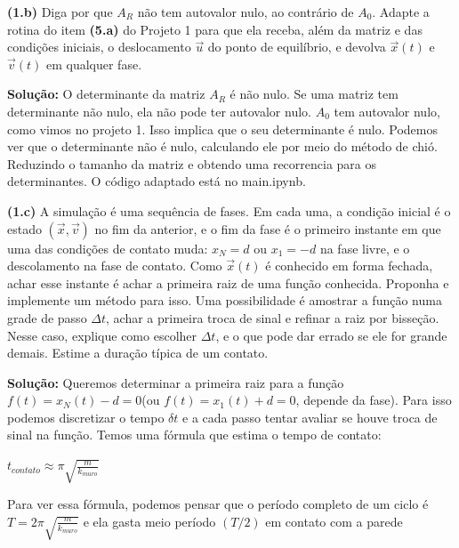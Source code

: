 \vspace{0.3cm}
\textbf{(1.b)} Diga por que $A_R$ não tem autovalor nulo, ao contrário de $A_0$. Adapte a rotina do item
\textbf{(5.a)} do Projeto 1 para que ela receba, além da matriz e das condições iniciais, o deslocamento $\vec{u}$
do ponto de equilíbrio, e devolva $\vec{x}(t)$ e $\vec{v}(t)$ em qualquer fase.

\vspace{0.3cm}
\textbf{Solução:}
O determinante da matriz $A_R$ é não nulo. Se uma matriz tem determinante não nulo, ela não pode ter autovalor nulo.
$A_0$ tem autovalor nulo, como vimos no projeto 1. Isso implica que o seu determinante é nulo.
Podemos ver que o determinante não é nulo, calculando ele por meio do método de chió. Reduzindo o tamanho da matriz e obtendo uma recorrencia para os determinantes.
O código adaptado está no main.ipynb.


\vspace{0.3cm}

\textbf{(1.c)} A simulação é uma sequência de fases. Em cada uma, a condição inicial é o estado $(\vec{x},\vec{v})$
no fim da anterior, e o fim da fase é o primeiro instante em que uma das condições de contato
muda: $x_N = d$ ou $x_1 = -d$ na fase livre, e o descolamento na fase de contato. Como $\vec{x}(t)$ é
conhecido em forma fechada, achar esse instante é achar a primeira raiz de uma função conhecida.
Proponha e implemente um método para isso. Uma possibilidade é amostrar a função numa
grade de passo $\Delta t$, achar a primeira troca de sinal e refinar a raiz por bisseção. Nesse caso,
explique como escolher $\Delta t$, e o que pode dar errado se ele for grande demais. Estime a duração
típica de um contato.

\vspace{0.3cm}
\textbf{Solução:}
Queremos determinar a primeira raiz para a função $f(t) = x_N(t)-d = 0$(ou $f(t) = x_1(t)+d = 0$, depende da fase). Para isso podemos discretizar o tempo $\delta t$ e a cada passo tentar avaliar se houve troca de sinal na função.
Temos uma fórmula que estima o tempo de contato:
\begin{center}
    $t_{contato} \approx \pi \sqrt{\frac{m}{k_{muro}}}$
\end{center}

Para ver essa fórmula, podemos pensar que o período completo de um ciclo é $T = 2 \pi \sqrt{\frac{m}{k_{muro}}}$
e ela gasta meio período $(T/2)$ em contato com a parede

\vspace{2.46cm}

